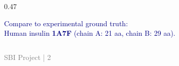 \documentclass[aspectratio=169,10pt]{beamer}
\begin{document}
\begin{frame}[plain]
\begin{minipage}{0.90\textwidth}
\begin{columns}[T,totalwidth=\textwidth]
\begin{column}{0.47\textwidth}
\vspace{0.08cm}

{\fontsize{7.2}{8.5}\selectfont
\textcolor{navy}{
Compare to experimental ground truth:\\[-0.5mm]
Human insulin \textbf{1A7F} (chain A: 21 aa, chain B: 29 aa).
}}

\end{column}

\end{columns}

\end{minipage}

\vfill
\hspace{0.95cm}
{\fontsize{5.5}{6.0}\selectfont\textcolor{gray}{SBI Project | 2}}
\vspace{0.26cm}

\end{frame}
\end{document}
